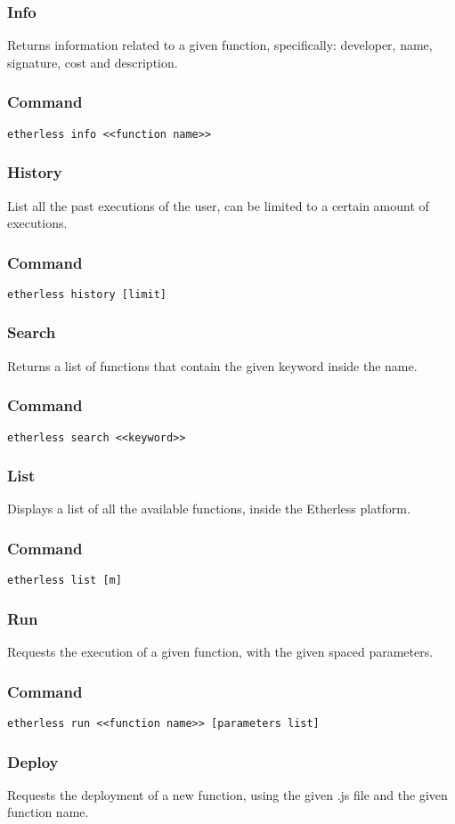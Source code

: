 	\subsubsection{Info}
	Returns information related to a given function, specifically: developer, name, signature, cost and description.
	\subsubsection*{Command}
	\texttt{etherless info <<function name>>}
	\subsubsection{History}
	List all the past executions of the user, can be limited to a certain amount of executions.
	\subsubsection*{Command}
	\texttt{etherless history [limit]}
	\subsubsection{Search}
	Returns a list of functions that contain the given keyword inside the name.
	\subsubsection*{Command}
	\texttt{etherless search <<keyword>>}
	\subsubsection{List}
	Displays a list of all the available functions, inside the Etherless platform.
	\subsubsection*{Command}
	\texttt{etherless list [m]}
	\subsubsection{Run}
	Requests the execution of a given function, with the given spaced parameters.
	\subsubsection*{Command}
	\texttt{etherless run <<function name>> [parameters list]}
	\subsubsection{Deploy}
	Requests the deployment of a new function, using the given .js file and the given function name.
